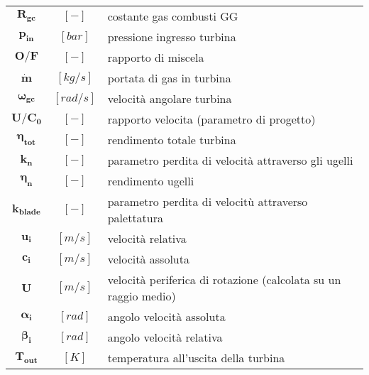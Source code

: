 \begin{multicols}{2}
{\begin{xltabular}{\linewidth}{cc>{\raggedright\arraybackslash}X}
		$\bm{R_{gc}}$ & $[-]$ & costante gas combusti GG \\
		$\bm{p_{in}}$ & $[bar]$ & pressione ingresso turbina \\
		$\bm{O/F}$ & $[-]$ & rapporto di miscela\\
		$\bm{\dot{m}}$ & $[kg/s]$ & portata di gas in turbina\\
		$\bm{\omega_{gc}}$ & $[rad/s]$ & velocità angolare turbina \\
		$\bm{U/C_0}$ & $[-]$ & rapporto velocita (parametro di progetto) \\
		$\bm{\eta_{tot}}$ & $[-]$ & rendimento totale turbina \\
		$\bm{k_n}$ & $[-]$ & parametro perdita di velocità attraverso gli ugelli  \\
		$\bm{\eta_n}$ & $[-]$ & rendimento ugelli \\
		$\bm{k_{blade}}$ & $[-]$ & parametro perdita di velocitù attraverso palettatura \\
		$\bm{u_i}$ & $[m/s]$ & velocità relativa \\
		$\bm{c_i}$ & $[m/s]$ & velocità assoluta \\
		$\bm{U}$ & $[m/s]$ & velocità periferica di rotazione (calcolata su un raggio medio) \\
		$\bm{\alpha_i}$ & $[rad]$ & angolo velocità assoluta \\
		$\bm{\beta_i}$ & $[rad]$ & angolo velocità relativa \\
		$\bm{T_{out}}$ & $[K]$ & temperatura all'uscita della turbina
	\end{xltabular}
	\unskip
	\unpenalty
	\unpenalty}
	\unvbox\ltmcbox


\end{multicols}
